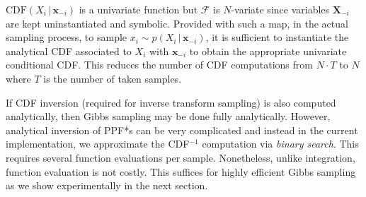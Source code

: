 \documentclass[letterpaper]{article}
\newcommand{\bvec}[1]{\textbf{#1}}
\newcommand{\pr}{p}
\begin{document}
$\text{CDF}(X_i  \,|\, \bvec{x}_{-i})$ is a univariate function but 
$\mathcal{F}$ is $N$-variate since variables $\bvec{X}_{-i}$ are kept uninstantiated and symbolic.
Provided with such a map, in the actual sampling process, 
to sample $x_i \sim \pr(X_i \,|\, \bvec{x}_{-i})$,
it is sufficient to instantiate the analytical CDF associated to $X_i$ with  
$\bvec{x}_{-i}$ to obtain the appropriate univariate conditional CDF.
This reduces the number of CDF computations from $N\cdot T$ to $N$ where 
$T$ is the number of taken samples.

If CDF inversion (required for inverse transform sampling) is also
computed analytically, then Gibbs sampling may be done fully
analytically.  However, analytical inversion of PPF*s can be very
complicated and instead in the current implementation, we approximate
the CDF$^{-1}$ computation via \emph{binary search}. 
This requires several function evaluations per sample. Nonetheless, unlike integration, function evaluation is not costly. This suffices for highly efficient Gibbs sampling as we show experimentally in the next section.
\end{document}
